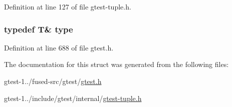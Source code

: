 \-Definition at line 127 of file gtest-\/tuple.\-h.

\hypertarget{structstd_1_1tr1_1_1gtest__internal_1_1AddRef_a08e05528fbb401bd8299a21d67d13ee3}{
\subsubsection[{type}]{\setlength{\rightskip}{0pt plus 5cm}typedef \-T\& {\bf type}}}\label{d8/db3/structstd_1_1tr1_1_1gtest__internal_1_1AddRef_a08e05528fbb401bd8299a21d67d13ee3}


\-Definition at line 688 of file gtest.\-h.



\-The documentation for this struct was generated from the following files\-:\begin{DoxyCompactItemize}
\item 
gtest-\/1../fused-\/src/gtest/\hyperlink{fused-src_2gtest_2gtest_8h}{gtest.\-h}\item 
gtest-\/1../include/gtest/internal/\hyperlink{gtest-tuple_8h}{gtest-\/tuple.\-h}\end{DoxyCompactItemize}

